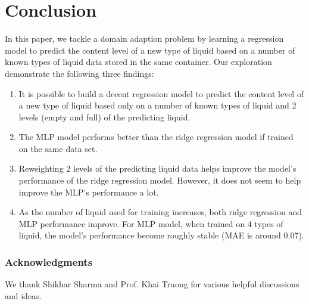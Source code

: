 \documentclass{article} %
\begin{document}
\section{Conclusion}
In this paper, we tackle a domain adaption problem by learning a regression model to predict the content level of a new type of liquid based on a number of known types of liquid data stored in the same container. Our exploration demonstrate the following three findings: 
\begin{enumerate}
\item It is possible to build a decent regression model to predict the content level of a new type of liquid based only on a number of known types of liquid and 2 levels (empty and full) of the predicting liquid.

\item The MLP model performs better than the ridge regression model if trained on the same data set.

\item Reweighting 2 levels of the predicting liquid data helps improve the model's performance of the ridge regression model. However, it does not seem to help improve the MLP's performance a lot.

\item As the number of liquid used for training increases, both ridge regression and MLP performance improve. For MLP model, when trained on 4 types of liquid, the model's performance become roughly stable (MAE is around 0.07).   
\end{enumerate}

\subsubsection*{Acknowledgments}
We thank Shikhar Sharma and Prof. Khai Truong for various helpful discussions and ideas.




\end{document}
